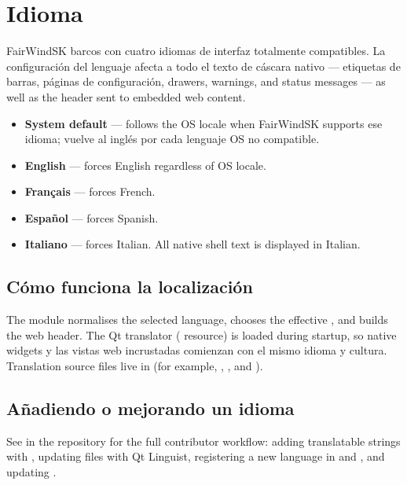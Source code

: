 \section{Idioma}

FairWindSK barcos con cuatro idiomas de interfaz totalmente compatibles.
La configuración del lenguaje afecta a todo el texto de cáscara nativo --- etiquetas de barras, páginas de configuración,
drawers, warnings, and status messages --- as well as the 
header sent to embedded web content.

\begin{itemize}
  \item \textbf{System default} --- follows the OS locale when FairWindSK supports
ese idioma; vuelve al inglés por cada lenguaje OS no compatible.
  \item \textbf{English} --- forces English regardless of OS locale.
  \item \textbf{Français} --- forces French.
  \item \textbf{Español} --- forces Spanish.
  \item \textbf{Italiano} --- forces Italian. All native shell text is displayed in Italian.
\end{itemize}

\subsection{Cómo funciona la localización}

The  module normalises the selected language, chooses the
effective , and builds the web  header.
The Qt translator ( resource) is loaded during startup, so native widgets
y las vistas web incrustadas comienzan con el mismo idioma y cultura.
Translation source files live in  (for example,
, , and
).

\subsection{Añadiendo o mejorando un idioma}

See  in the repository for the full contributor workflow:
adding translatable strings with , updating  files with
Qt Linguist, registering a new language in  and
, and updating .

